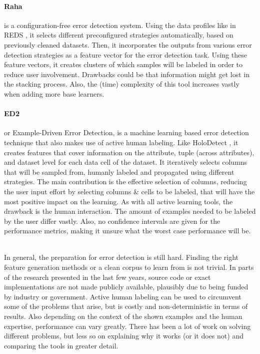\paragraph{Raha \cite{Mahdavi2019-zf}} is a configuration-free error detection system. Using the data profiles like in REDS \cite{Mahdavi2019-pk}, it selects different preconfigured strategies automatically, based on previously cleaned datasets. Then, it incorporates the outputs from various error detection strategies as a feature vector for the error detection task. 
Using these feature vectors, it creates clusters of which samples will be labeled in order to reduce user involvement. Drawbacks could be that information might get lost in the stacking process. Also, the (time) complexity of this tool increases vastly when adding more base learners.

\paragraph{ED2 \cite{Neutatz2019-aw}} or Example-Driven Error Detection, is a machine learning based error detection technique that also makes use of active human labeling. 
Like HoloDetect \cite{Heidari2019-ox}, it creates features that cover information on the attribute, tuple (across attributes), and dataset level for each data cell of the dataset. It iteratively selects columns that will be sampled from, humanly labeled and propagated using different strategies. The main contribution is the effective selection of columns, reducing the user input effort by selecting columns \& cells to be labeled, that will have the most positive impact on the learning. As with all active learning tools, the drawback is the human interaction. The amount of examples needed to be labeled by the user differ vastly. Also, no confidence intervals are given for the performance metrics, making it unsure what the worst case performance will be. 

~\\In general, the preparation for error detection is still hard. Finding the right feature generation methods or a clean corpus to learn from is not trivial. In parts of the research presented in the last few years, source code or exact implementations are not made publicly available, plausibly due to being funded by industry or government. Active human labeling can be used to circumvent some of the problems that arise, but is costly and non-deterministic in terms of results. Also depending on the context of the shown examples and the human expertise, performance can vary greatly. There has been a lot of work on solving different problems, but less so on explaining why it works (or it does not) and comparing the tools in greater detail.